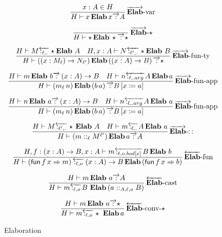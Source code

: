 \begin{figure}
\[
\frac{x:A\in H}{H\vdash x\,\textbf{Elab}\,x\overrightarrow{\,:\,}A}\operatorname{\overrightarrow{\textbf{Elab}}-var}
\]
 
\[
\frac{\,}{H\vdash\star\,\textbf{Elab}\,\star\overrightarrow{\,:\,}\star}\operatorname{\overrightarrow{\textbf{Elab}}-\star}
\]
 
\[
\frac{H\vdash M\overleftarrow{\,:_{\ell,.}\,}\star\textbf{Elab}\ A\quad H,x:A\vdash N\overleftarrow{\,:_{\ell',.}\,}\star\textbf{Elab}\ B}{H\vdash\left(\left(x:M_{\ensuremath{\ell}}\right)\rightarrow N_{\ensuremath{\ell'}}\right)\textbf{Elab}\left(\left(x:A\right)\rightarrow B\right)\overrightarrow{\,:\,}\star}\rulename{\overrightarrow{\textbf{Elab}}-fun-ty}
\]
 
\[
\frac{H\vdash m\,\textbf{Elab}\ b\overrightarrow{\,:\,}\left(x:A\right)\rightarrow B\quad H\vdash n\overleftarrow{\,:_{\ell,.arg}\,}A\,\textbf{Elab}\,a}{H\vdash\left(m_{\ell}\,n\right)\textbf{Elab}\left(b\,a\right)\overrightarrow{\,:\,}B\left[x\coloneqq a\right]}\rulename{\overrightarrow{\textbf{Elab}}-fun-app}
\]
 
\[
\frac{H\vdash n\,\textbf{Elab}\ a\overrightarrow{\,:\,}\left(x:A\right)\rightarrow B\quad H\vdash n\overleftarrow{\,:_{\ell,.arg}\,}A\,\textbf{Elab}\ a}{H\vdash\left(m_{\ell}\,n\right)\textbf{Elab}\left(b\,a\right)\overrightarrow{\,:\,}B\left[x\coloneqq a\right]}\rulename{\overrightarrow{\textbf{Elab}}-fun-app}
\]
 
\[
\frac{H\vdash M\overleftarrow{\,:_{\ell',.}\,}\star\,\textbf{Elab}\ A\quad H\vdash m\overleftarrow{\,:_{\ell,.}\,}A\,\textbf{Elab}\ a}{H\vdash\left(m::_{\ell}M^{\ell'}\right)\textbf{Elab}\,a\overrightarrow{\,:\,}A}\rulename{\overrightarrow{\textbf{Elab}}-::}
\]
 
\[
\frac{H,f:\left(x:A\right)\rightarrow B,x:A\vdash m\overleftarrow{\,:_{\ell,o.bod[x]}\,}B\,\textbf{Elab}\ b}{H\vdash\left(\mathsf{fun}\,f\,x\Rightarrow m\right)\overleftarrow{\,:_{\ell,o}\,}\left(x:A\right)\rightarrow B\,\textbf{Elab}\left(\mathsf{fun}\,f\,x\Rightarrow b\right)}\rulename{\overleftarrow{\textbf{Elab}}-fun}
\]
 
\[
\frac{H\vdash m\,\textbf{Elab}\ a\overrightarrow{\,:\,}A}{H\vdash m\overleftarrow{\,:_{\ell,o}\,}B\ \textbf{Elab}\left(a::_{A,\ensuremath{\ell},o}B\right)}\rulename{\overleftarrow{\textbf{Elab}}-cast}
\]
 
\[
\frac{H\vdash m\,\textbf{Elab}\ a\overrightarrow{\,:\,}\star}{H\vdash m\overleftarrow{\,:_{\ell,o}\,}\star\ \textbf{Elab}\,a}\rulename{\overleftarrow{\textbf{Elab}}-conv-\star}
\]
 
 
\caption{Elaboration}
\label{fig:elaboration}
\end{figure}
 
